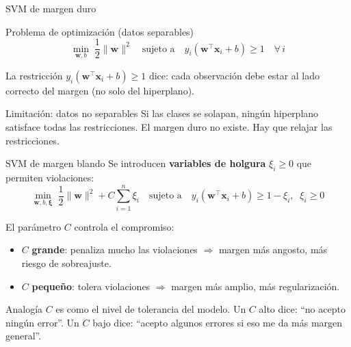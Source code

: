 \documentclass[aspectratio=169]{beamer}
\newcommand{\bx}{\bm{x}}
\newcommand{\bw}{\bm{w}}
\begin{document}
\begin{frame}{SVM de margen duro}
  \begin{block}{Problema de optimización (datos separables)}
    \[
      \min_{\bw, b} \;\frac{1}{2}\|\bw\|^2
      \quad\text{sujeto a}\quad
      y_i(\bw^\top \bx_i + b) \geq 1 \quad \forall\, i
    \]
  \end{block}

  \medskip
  La restricción $y_i(\bw^\top \bx_i + b) \geq 1$ dice:
  cada observación debe estar al lado correcto del margen (no solo del hiperplano).

  \medskip
  \begin{alertblock}{Limitación: datos no separables}
    Si las clases se solapan, ningún hiperplano satisface todas las restricciones.
    El margen duro no existe. Hay que relajar las restricciones.
  \end{alertblock}
\end{frame}

\begin{frame}{SVM de margen blando}
  Se introducen \textbf{variables de holgura} $\xi_i \geq 0$ que permiten violaciones:
  \[
    \min_{\bw, b, \bm{\xi}} \;\frac{1}{2}\|\bw\|^2 + C\sum_{i=1}^{n} \xi_i
    \quad\text{sujeto a}\quad
    y_i(\bw^\top \bx_i + b) \geq 1 - \xi_i,\;\; \xi_i \geq 0
  \]

  \medskip
  El parámetro $C$ controla el compromiso:
  \begin{itemize}
    \item $C$ \textbf{grande}: penaliza mucho las violaciones $\Rightarrow$ margen más angosto, más riesgo de sobreajuste.
    \item $C$ \textbf{pequeño}: tolera violaciones $\Rightarrow$ margen más amplio, más regularización.
  \end{itemize}

  \medskip
  \begin{exampleblock}{Analogía}
    $C$ es como el nivel de tolerancia del modelo.
    Un $C$ alto dice: ``no acepto ningún error''. Un $C$ bajo dice: ``acepto algunos errores si eso me da más margen general''.
  \end{exampleblock}
\end{frame}
\end{document}

